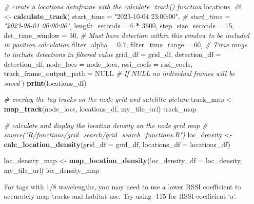 \documentclass[
]{book}
\newenvironment{Shaded}{\begin{snugshade}}{\end{snugshade}}
\newcommand{\AttributeTok}[1]{\textcolor[rgb]{0.13,0.29,0.53}{#1}}
\newcommand{\CommentTok}[1]{\textcolor[rgb]{0.56,0.35,0.01}{\textit{#1}}}
\newcommand{\ConstantTok}[1]{\textcolor[rgb]{0.56,0.35,0.01}{#1}}
\newcommand{\DecValTok}[1]{\textcolor[rgb]{0.00,0.00,0.81}{#1}}
\newcommand{\FloatTok}[1]{\textcolor[rgb]{0.00,0.00,0.81}{#1}}
\newcommand{\FunctionTok}[1]{\textcolor[rgb]{0.13,0.29,0.53}{\textbf{#1}}}
\newcommand{\NormalTok}[1]{#1}
\newcommand{\OtherTok}[1]{\textcolor[rgb]{0.56,0.35,0.01}{#1}}
\newcommand{\SpecialCharTok}[1]{\textcolor[rgb]{0.81,0.36,0.00}{\textbf{#1}}}
\newcommand{\StringTok}[1]{\textcolor[rgb]{0.31,0.60,0.02}{#1}}
\begin{document}
\begin{Shaded}
\begin{Highlighting}[]
\CommentTok{\# create a locations dataframe with the calculate\_track() function}
\NormalTok{locations\_df }\OtherTok{\textless{}{-}} \FunctionTok{calculate\_track}\NormalTok{(}
  \AttributeTok{start\_time =} \StringTok{"2023{-}10{-}04 23:00:00"}\NormalTok{,}
  \CommentTok{\# start\_time = "2023{-}08{-}01 00:00:00",}
  \AttributeTok{length\_seconds =} \DecValTok{6} \SpecialCharTok{*} \DecValTok{3600}\NormalTok{,}
  \AttributeTok{step\_size\_seconds =} \DecValTok{15}\NormalTok{,}
  \AttributeTok{det\_time\_window =} \DecValTok{30}\NormalTok{, }\CommentTok{\# Must have detection within this window to be included in position calculation}
  \AttributeTok{filter\_alpha =} \FloatTok{0.7}\NormalTok{,}
  \AttributeTok{filter\_time\_range =} \DecValTok{60}\NormalTok{, }\CommentTok{\# Time range to include detections in filtered value}
  \AttributeTok{grid\_df =}\NormalTok{ grid\_df,}
  \AttributeTok{detection\_df =}\NormalTok{ detection\_df,}
  \AttributeTok{node\_locs =}\NormalTok{ node\_locs,}
  \AttributeTok{rssi\_coefs =}\NormalTok{ rssi\_coefs,}
  \AttributeTok{track\_frame\_output\_path =} \ConstantTok{NULL} \CommentTok{\# If NULL no individual frames will be saved}
\NormalTok{)}
\FunctionTok{print}\NormalTok{(locations\_df)}

\CommentTok{\# overlay the tag tracks on the node grid and satelitte picture}
\NormalTok{track\_map }\OtherTok{\textless{}{-}} \FunctionTok{map\_track}\NormalTok{(node\_locs, }
\NormalTok{                       locations\_df, }
\NormalTok{                       my\_tile\_url)}
\NormalTok{track\_map}

\CommentTok{\# calculate and display the location density on the node grid map}
\CommentTok{\# source("R/functions/grid\_search/grid\_search\_functions.R")}
\NormalTok{loc\_density }\OtherTok{\textless{}{-}} \FunctionTok{calc\_location\_density}\NormalTok{(}\AttributeTok{grid\_df =}\NormalTok{ grid\_df, }
                                     \AttributeTok{locations\_df =}\NormalTok{ locations\_df)}

\NormalTok{loc\_density\_map }\OtherTok{\textless{}{-}} \FunctionTok{map\_location\_density}\NormalTok{(}\AttributeTok{loc\_density\_df =}\NormalTok{ loc\_density, my\_tile\_url)}
\NormalTok{loc\_density\_map}
\end{Highlighting}
\end{Shaded}

For tags with 1/8 wavelengths, you may need to use a lower RSSI coefficient to accurately map tracks and habitat use. Try using -115 for RSSI coefficient `a'.
\end{document}
